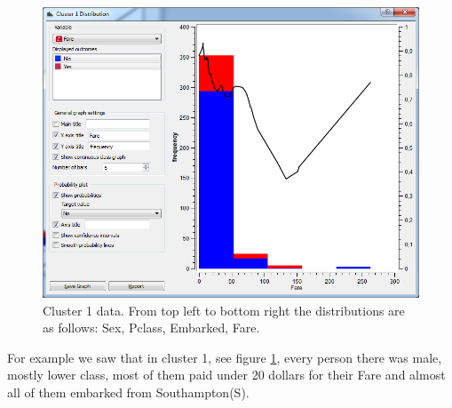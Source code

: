 \documentclass[a4paper,11pt]{article}
\begin{document}
\begin{figure}[h]
\begin{center}
		\includegraphics[scale=0.25]{ClusterDistribution/Cluster1/Fare}
	\end{center}
	\caption{Cluster 1 data. From top left to bottom right the distributions are as follows: Sex, Pclass, Embarked, Fare.}
	\label{ClusterOne}
\end{figure}

For example we saw that in cluster 1, see figure \ref{ClusterOne}, every person there was male, mostly lower class, most of them paid under 20 dollars for their Fare and almost all of them embarked from Southampton(S).
\end{document}
